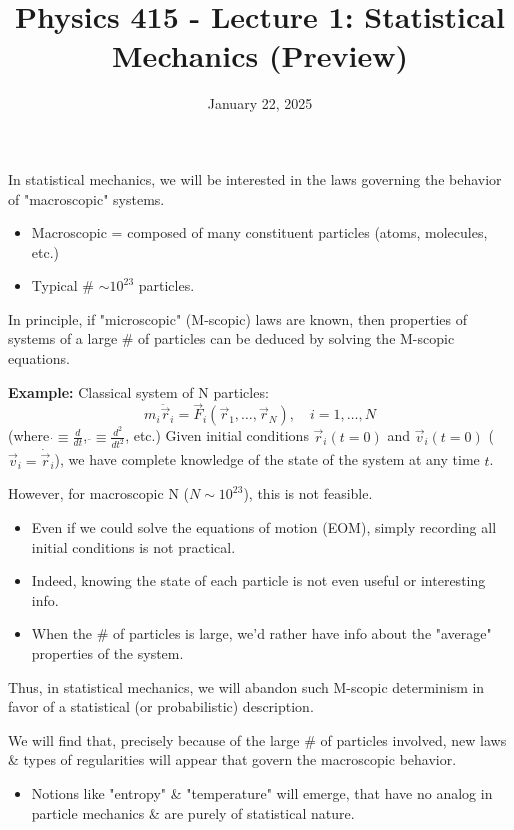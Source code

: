 \documentclass[11pt]{article}
\title{Physics 415 - Lecture 1: Statistical Mechanics (Preview)}
\date{January 22, 2025}
\author{} %
\begin{document}
\maketitle
\thispagestyle{empty}

In statistical mechanics, we will be interested in the laws governing the behavior of "macroscopic" systems.
\begin{itemize}
    \item Macroscopic = composed of many constituent particles (atoms, molecules, etc.)
    \item Typical \# $\sim 10^{23}$ particles. %
\end{itemize}
In principle, if "microscopic" (M-scopic) laws are known, then properties of systems of a large \# of particles can be deduced by solving the M-scopic equations.

\textbf{Example:} Classical system of N particles:
\[ m_i \ddot{\vec{r}}_i = \vec{F}_i(\vec{r}_1, \dots, \vec{r}_N), \quad i=1, \dots, N \]
(where $\dot{} \equiv \frac{d}{dt}$, $\ddot{} \equiv \frac{d^2}{dt^2}$, etc.)
Given initial conditions $\vec{r}_i(t=0)$ and $\vec{v}_i(t=0)$ ($\vec{v}_i = \dot{\vec{r}}_i$), we have complete knowledge of the state of the system at any time $t$.

However, for macroscopic N ($N \sim 10^{23}$), this is not feasible.
\begin{itemize}
    \item Even if we could solve the equations of motion (EOM), simply recording all initial conditions is not practical.
    \item Indeed, knowing the state of each particle is not even useful or interesting info.
    \item When the \# of particles is large, we'd rather have info about the "average" properties of the system.
\end{itemize}

Thus, in statistical mechanics, we will abandon such M-scopic determinism in favor of a statistical (or probabilistic) description.

We will find that, precisely because of the large \# of particles involved, new laws \& types of regularities will appear that govern the macroscopic behavior.
\begin{itemize}
    \item Notions like "entropy" \& "temperature" will emerge, that have no analog in particle mechanics \& are purely of statistical nature.
\end{itemize}
\end{document}
